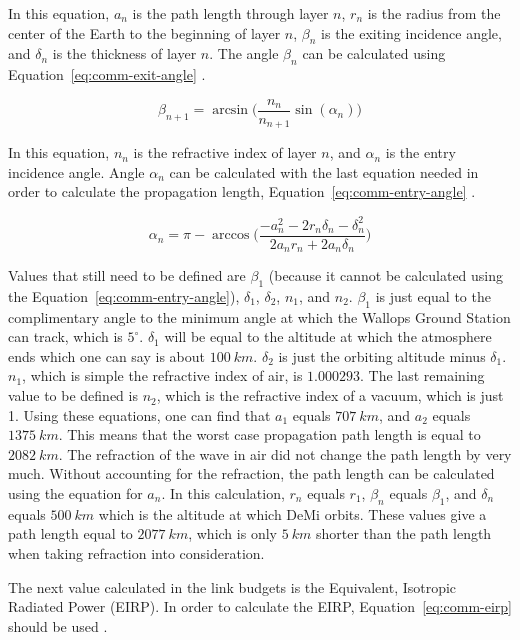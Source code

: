\documentclass[12pt]{article}
\begin{document}
In this equation, $a_n$ is the path length through layer $n$, $r_n$ is the radius from the center of the Earth to the beginning of layer $n$, $\beta_n$ is the exiting incidence angle, and $\delta_n$ is the thickness of layer $n$.
The angle $\beta_n$ can be calculated using Equation~\ref{eq:comm-exit-angle} \cite[p.~10]{ITU-R}.

\begin{equation}\label{eq:comm-exit-angle}
\beta_{n+1} = \arcsin\biggl(\frac{n_n}{n_{n+1}}\sin(\alpha_n)\biggr) 
\end{equation}

In this equation, $n_n$ is the refractive index of layer $n$, and $\alpha_n$ is the entry incidence angle. Angle $\alpha_n$ can be calculated with the last equation needed in order to calculate the propagation length, Equation~\ref{eq:comm-entry-angle} \cite[p.~9]{ITU-R}.

\begin{equation}\label{eq:comm-entry-angle}
\alpha_n = \pi - \arccos \biggl(\frac{-a_n^2 - 2r_n\delta_n - \delta_n^2}{2a_n r_n + 2a_n \delta_n}\biggr) 
\end{equation}

Values that still need to be defined are $\beta_1$ (because it cannot be calculated using the Equation~\ref{eq:comm-entry-angle}), $\delta_1$, $\delta_2$, $n_1$, and $n_2$. $\beta_1$ is just equal to the complimentary angle to the minimum angle at which the Wallops Ground Station can track, which is $5^\circ$. $\delta_1$ will be equal to the altitude at which the atmosphere ends which one can say is about $100\ km$. $\delta_2$ is just the orbiting altitude minus $\delta_1$. $n_1$, which is simple the refractive index of air, is $1.000293$. The last remaining value to be defined is $n_2$, which is the refractive index of a vacuum, which is just 1. Using these equations, one can find that $a_1$ equals $707\ km$, and $a_2$ equals $1375\ km$. This means that the worst case propagation path length is equal to $2082\ km$. The refraction of the wave in air did not change the path length by very much. Without accounting for the refraction, the path length can be calculated using the equation for $a_n$. In this calculation, $r_n$ equals $r_1$, $\beta_n$ equals $\beta_1$, and $\delta_n$ equals $500\ km$ which is the altitude at which DeMi orbits. These values give a path length equal to $2077\ km$, which is only $5\ km$ shorter than the path length when taking refraction into consideration.

The next value calculated in the link budgets is the Equivalent, Isotropic Radiated Power (EIRP). In order to calculate the EIRP, Equation~\ref{eq:comm-eirp} should be used \cite[p.~476]{SMAD}.
\end{document}
